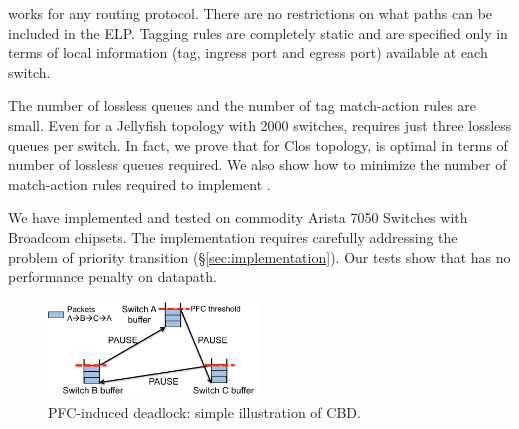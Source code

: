 \system works for any routing protocol. There are no restrictions on what paths
can be included in the ELP. Tagging rules are completely static and are
specified only in terms of local information (tag, ingress port and egress port)
available at each switch. 

The number of lossless queues and the number of tag match-action rules are
small.  Even for a Jellyfish topology with 2000 switches, \sysname{} requires
just three lossless queues per switch.  In fact, we prove that for Clos
topology,  \sysname{} is optimal in terms of number of lossless queues required.
We also show how to minimize the number of match-action rules required to
implement \sysname{}.

We have implemented and tested \sysname{} on commodity Arista 7050 Switches with
Broadcom chipsets. The implementation requires carefully addressing the problem
of priority transition (\S\ref{sec:implementation}). Our tests show that
\sysname{} has no performance penalty on datapath.

\begin{figure}
	\centering
	\includegraphics[width=0.5\textwidth] {figs/deadlock}
	\vspace{-0.15in}
	\caption{PFC-induced deadlock: simple illustration of CBD.}
	\vspace{-0.15in}
	\label{fig:deadlock_example}
\end{figure}
